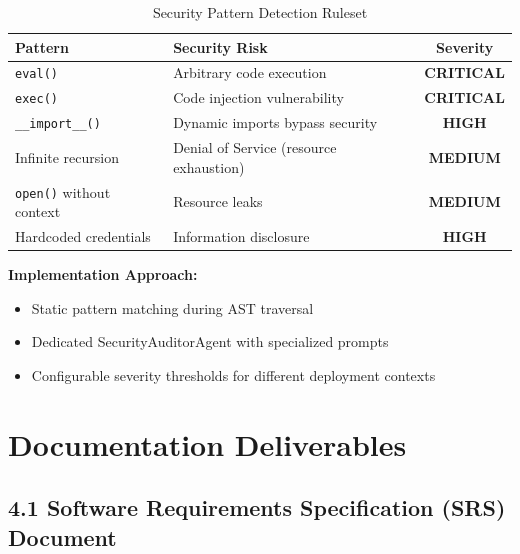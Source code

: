 \documentclass[a4paper,11pt]{article}
\newcommand{\statuspending}[1]{\colorbox{yellow!20}{\textbf{#1}}}
\newcommand{\statusissue}[1]{\colorbox{red!20}{\textbf{#1}}}
\begin{document}
\begin{table}[h]
\centering
\begin{tabularx}{\textwidth}{|l|X|c|}
\hline
\rowcolor{blue!10}
\textbf{Pattern} & \textbf{Security Risk} & \textbf{Severity} \\
\hline
\texttt{eval()} & Arbitrary code execution & \statusissue{CRITICAL} \\
\hline
\texttt{exec()} & Code injection vulnerability & \statusissue{CRITICAL} \\
\hline
\texttt{\_\_import\_\_()} & Dynamic imports bypass security & \statusissue{HIGH} \\
\hline
Infinite recursion & Denial of Service (resource exhaustion) & \statuspending{MEDIUM} \\
\hline
\texttt{open()} without context & Resource leaks & \statuspending{MEDIUM} \\
\hline
Hardcoded credentials & Information disclosure & \statusissue{HIGH} \\
\hline
\end{tabularx}
\caption{Security Pattern Detection Ruleset}
\end{table}

\textbf{Implementation Approach:}
\begin{itemize}[leftmargin=*]
    \item Static pattern matching during AST traversal
    \item Dedicated SecurityAuditorAgent with specialized prompts
    \item Configurable severity thresholds for different deployment contexts
\end{itemize}

\section{Documentation Deliverables}

\subsection{4.1 Software Requirements Specification (SRS) Document}
\end{document}
